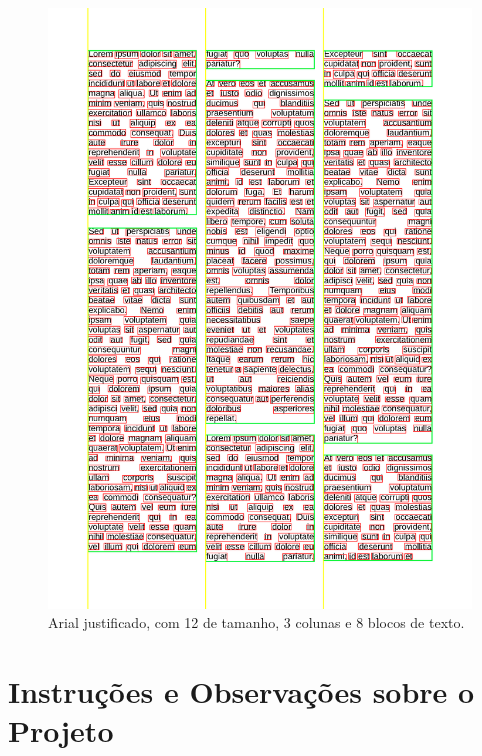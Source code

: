 \documentclass[english, 
               brazil, 
               bsc] %
               {dcomp-abntex2}
\begin{document}
\begin{figure}[h]
        \caption{\label{arial} \small Arial justificado, com 12 de tamanho, 3 colunas e 8 blocos de texto.}
        \begin{center}
            \includegraphics[scale=0.25]{./images/arial_justificado_tamanho_12_colunas_3_blocos_8_linhas_52_palavras_557.png}
        \end{center}
\end{figure}








\chapter{Instruções e Observações sobre o Projeto}
\label{ch-notas}
\end{document}
